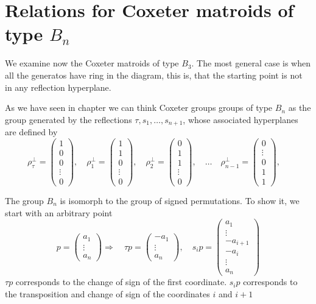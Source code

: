 \documentclass[leqno]{article}
\numberwithin{equation}{section}
\numberwithin{theorem}{section}
\begin{document}
\section{Relations for Coxeter matroids of type $B_n$}
We examine now the Coxeter matroids of type $B_3$. The most general case is when all the generatos have ring in the diagram, this is, that the starting point is not in any reflection hyperplane.

As we have seen in chapter we can think Coxeter groups groups of type $B_n$ as the group generated by the reflections  $\tau, s_1, \ldots, s_{n+1}$, whose associated hyperplanes are defined by
\[
\rho_\tau ^\perp = \begin{pmatrix} 1 \\ 0 \\ 0 \\  \vdots \\ 0 \end{pmatrix} , \quad 
\rho_1 ^\perp = \begin{pmatrix} 1 \\ 1 \\ 0\\ \vdots \\ 0 \end{pmatrix} , \quad 
\rho_2 ^\perp = \begin{pmatrix} 0 \\ 1 \\ 1\\ \vdots \\ 0 \end{pmatrix} , \quad \ldots \quad
\rho_{n-1} ^\perp = \begin{pmatrix} 0 \\ \vdots \\ 0 \\ 1\\ 1 \end{pmatrix} , \quad 
\] 

The group $B_n$ is isomorph to the group of signed permutations. To show it, we start with an arbitrary point
\[
p =  \begin{pmatrix} a_1 \\ \vdots \\ a_n \end{pmatrix} \Rightarrow \quad \tau p = \begin{pmatrix} -a_1 \\ \vdots \\ a_n \end{pmatrix}, \quad  s_ip = \begin{pmatrix} a_1 \\ \vdots \\ -a_{i+1}\\-a_{i}\\ \vdots \\ a_n  \end{pmatrix} 
\]
$\tau p$ corresponds to the change of sign of the first coordinate. $s_ip$ corresponds to the transposition and change of sign of the coordinates $i$ and  $i+1$
\end{document}
